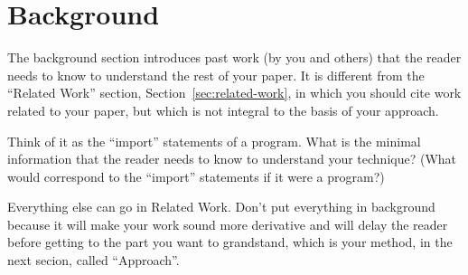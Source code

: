 \section{Background}
\label{sec:background}

The background section introduces past work (by you
and others) that the reader needs to know to understand
the rest of your paper.
%
It is different from the ``Related Work'' section,
Section~\ref{sec:related-work},
in which you should cite work related to your paper,
but which is not integral to the basis of your approach.

Think of it as the ``import'' statements of a program. 
What is the minimal information that the reader needs to 
know to understand your technique? (What would correspond 
to the ``import'' statements if it were a program?)

Everything else can go in Related Work. Don't put
everything in background because it will make your
work sound more derivative and will delay the reader
before getting to the part you want to grandstand, 
which is your method, in the next secion, called 
``Approach''.




